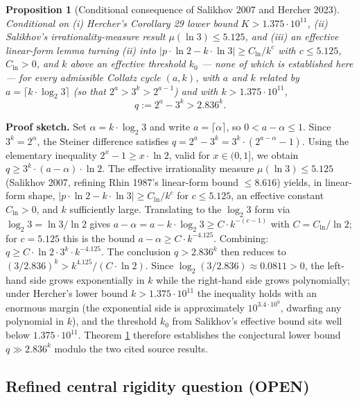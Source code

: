 \documentclass[
  11pt]{amsart}
\newcounter{none} %
\theoremstyle{plain}
\newtheorem{proposition}[theorem]{Proposition}
\theoremstyle{definition}
\theoremstyle{remark}
\begin{document}
\begin{proposition}[Conditional consequence of Salikhov 2007 and Hercher 2023]
\label{thm:Aone}
\emph{Conditional on (i) Hercher's Corollary 29 lower bound
$K > 1.375 \cdot 10^{11}$, (ii) Salikhov's irrationality-measure
result $\mu(\ln 3) \leq 5.125$, and (iii) an effective
linear-form lemma turning (ii) into}
$|p \cdot \ln 2 - k \cdot \ln 3| \geq C_{\ln} / k^c$
\emph{with} $c \leq 5.125$, $C_{\ln} > 0$, \emph{and $k$ above an
effective threshold $k_0$ — none of which is established here} —
\emph{for every admissible Collatz cycle $(a, k)$, with $a$ and
$k$ related by} $a = \lceil k \cdot \log_2 3 \rceil$
\emph{(so that} $2^a > 3^k > 2^{a-1}$\emph{) and with}
$k > 1.375 \cdot 10^{11}$,
$$
q := 2^a - 3^k > 2.836^k.
$$
\end{proposition}

\textbf{Proof sketch.} Set \(\alpha = k \cdot \log_2 3\) and write
\(a = \lceil \alpha \rceil\), so \(0 < a - \alpha \leq 1\). Since
\(3^k = 2^{\alpha}\), the Steiner difference satisfies
\(q = 2^a - 3^k = 3^k \cdot (2^{a - \alpha} - 1)\). Using the elementary
inequality \(2^x - 1 \geq x \cdot \ln 2\), valid for \(x \in (0, 1]\),
we obtain \(q \geq 3^k \cdot (a - \alpha) \cdot \ln 2\). The effective
irrationality measure \(\mu(\ln 3) \leq 5.125\) (Salikhov 2007, refining
Rhin 1987's linear-form bound \(\leq 8.616\)) yields, in linear-form
shape, \(|p \cdot \ln 2 - k \cdot \ln 3| \geq C_{\ln} / k^c\) for
\(c \leq 5.125\), an effective constant \(C_{\ln} > 0\), and \(k\)
sufficiently large. Translating to the \(\log_2 3\) form via
\(\log_2 3 = \ln 3 / \ln 2\) gives
\(a - \alpha = a - k \cdot \log_2 3 \geq C \cdot k^{-(c-1)}\) with
\(C = C_{\ln} / \ln 2\); for \(c = 5.125\) this is the bound
\(a - \alpha \geq C \cdot k^{-4.125}\). Combining:
\(q \geq C \cdot \ln 2 \cdot 3^k \cdot k^{-4.125}\). The conclusion
\(q > 2.836^k\) then reduces to
\((3/2.836)^k > k^{4.125} / (C \cdot \ln 2)\). Since
\(\log_2(3/2.836) \approx 0.0811 > 0\), the left-hand side grows
exponentially in \(k\) while the right-hand side grows polynomially;
under Hercher's lower bound \(k > 1.375 \cdot 10^{11}\) the inequality
holds with an enormous margin (the exponential side is approximately
\(10^{3.4 \cdot 10^9}\), dwarfing any polynomial in \(k\)), and the
threshold \(k_0\) from Salikhov's effective bound sits well below
\(1.375 \cdot 10^{11}\). Theorem \ref{thm:Aone} therefore establishes
the conjectural lower bound \(q \gg 2.836^k\) modulo the two cited
source results.

\subsection{Refined central rigidity question
(OPEN)}\label{refined-central-rigidity-question-open}
\end{document}
